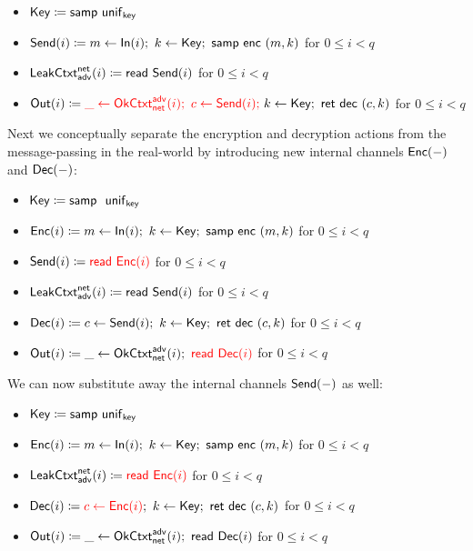 \begin{itemize}
\item $\mathsf{Key} \coloneqq \mathsf{samp} \ \mathsf{unif}_{\mathsf{key}}$
\item $\mathsf{Send}(i) \coloneqq m \leftarrow \mathsf{In}(i); \ k \leftarrow \mathsf{Key}; \ \mathsf{samp} \ \mathsf{enc} \ (m,k)$ for $0 \leq i < q$
\item $\mathsf{LeakCtxt}^{\mathsf{net}}_{\mathsf{adv}}(i) \coloneqq \mathsf{read} \ \mathsf{Send}(i)$ for $0 \leq i < q$
\item $\mathsf{Out}(i) \coloneqq {\color{red} \_ \leftarrow \mathsf{OkCtxt}^{\mathsf{adv}}_{\mathsf{net}}(i); \ c \leftarrow \mathsf{Send}(i);} \ k \leftarrow \mathsf{Key}; \ \mathsf{ret} \ \mathsf{dec} \ (c,k)$ for $0 \leq i < q$
\end{itemize}

\noindent Next we conceptually separate the encryption and decryption actions from the message-passing in the real-world by introducing new internal channels $\mathsf{Enc}(-)$ and $\mathsf{Dec}(-)$:

\begin{itemize}
\item $\Key \coloneqq \samp \ \unif_\key$
\item {\color{red} $\mathsf{Enc}(i) \coloneqq m \leftarrow \mathsf{In}(i); \ k \leftarrow \mathsf{Key}; \ \mathsf{samp} \ \mathsf{enc} \ (m,k)$ for $0 \leq i < q$}
\item $\mathsf{Send}(i) \coloneqq {\color{red} \mathsf{read} \ \mathsf{Enc}(i)}$ for $0 \leq i < q$
\item $\mathsf{LeakCtxt}^{\mathsf{net}}_{\mathsf{adv}}(i) \coloneqq \mathsf{read} \ \mathsf{Send}(i)$ for $0 \leq i < q$
\item {\color{red} $\mathsf{Dec}(i) \coloneqq c \leftarrow \mathsf{Send}(i); \ k \leftarrow \mathsf{Key}; \ \mathsf{ret} \ \mathsf{dec} \ (c,k)$ for $0 \leq i < q$}
\item $\mathsf{Out}(i) \coloneqq \_ \leftarrow \mathsf{OkCtxt}^{\mathsf{adv}}_{\mathsf{net}}(i); \ {\color{red} \mathsf{read} \ \mathsf{Dec}(i)}$ for $0 \leq i < q$
\end{itemize}

\noindent We can now substitute away the internal channels $\mathsf{Send}(-)$ as well:

\begin{itemize}
\item $\mathsf{Key} \coloneqq \mathsf{samp} \ \mathsf{unif}_{\mathsf{key}}$
\item $\mathsf{Enc}(i) \coloneqq m \leftarrow \mathsf{In}(i); \ k \leftarrow \mathsf{Key}; \ \mathsf{samp} \ \mathsf{enc} \ (m,k)$ for $0 \leq i < q$
\item $\mathsf{LeakCtxt}^{\mathsf{net}}_{\mathsf{adv}}(i) \coloneqq {\color{red} \mathsf{read} \ \mathsf{Enc}(i)}$ for $0 \leq i < q$
\item $\mathsf{Dec}(i) \coloneqq {\color{red} c \leftarrow \mathsf{Enc}(i)}; \ k \leftarrow \mathsf{Key}; \ \mathsf{ret} \ \mathsf{dec} \ (c,k)$ for $0 \leq i < q$
\item $\mathsf{Out}(i) \coloneqq \_ \leftarrow \mathsf{OkCtxt}^{\mathsf{adv}}_{\mathsf{net}}(i); \ \mathsf{read} \ \mathsf{Dec}(i)$ for $0 \leq i < q$
\end{itemize}

